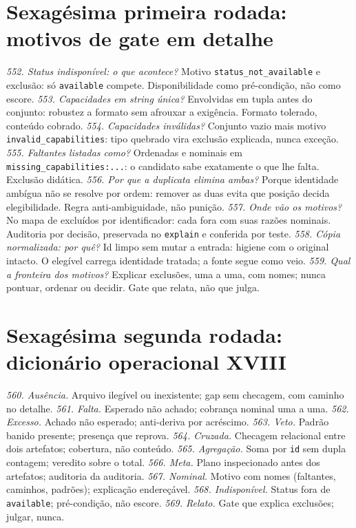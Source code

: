 \section{Sexagésima primeira rodada: motivos de gate em detalhe}
\textit{552. Status indisponível: o que acontece?} Motivo \texttt{status\_not\_available} e exclusão: só \texttt{available} compete. Disponibilidade como pré-condição, não como escore.
\textit{553. Capacidades em string única?} Envolvidas em tupla antes do conjunto: robustez a formato sem afrouxar a exigência. Formato tolerado, conteúdo cobrado.
\textit{554. Capacidades inválidas?} Conjunto vazio mais motivo \texttt{invalid\_capabilities}: tipo quebrado vira exclusão explicada, nunca exceção.
\textit{555. Faltantes listadas como?} Ordenadas e nominais em \texttt{missing\_capabilities:...}: o candidato sabe exatamente o que lhe falta. Exclusão didática.
\textit{556. Por que a duplicata elimina ambas?} Porque identidade ambígua não se resolve por ordem: remover as duas evita que posição decida elegibilidade. Regra anti-ambiguidade, não punição.
\textit{557. Onde vão os motivos?} No mapa de excluídos por identificador: cada fora com suas razões nominais. Auditoria por decisão, preservada no \texttt{explain} e conferida por teste.
\textit{558. Cópia normalizada: por quê?} Id limpo sem mutar a entrada: higiene com o original intacto. O elegível carrega identidade tratada; a fonte segue como veio.
\textit{559. Qual a fronteira dos motivos?} Explicar exclusões, uma a uma, com nomes; nunca pontuar, ordenar ou decidir. Gate que relata, não que julga.
\section{Sexagésima segunda rodada: dicionário operacional XVIII}
\textit{560. Ausência.} Arquivo ilegível ou inexistente; gap sem checagem, com caminho no detalhe.
\textit{561. Falta.} Esperado não achado; cobrança nominal uma a uma.
\textit{562. Excesso.} Achado não esperado; anti-deriva por acréscimo.
\textit{563. Veto.} Padrão banido presente; presença que reprova.
\textit{564. Cruzada.} Checagem relacional entre dois artefatos; cobertura, não conteúdo.
\textit{565. Agregação.} Soma por \texttt{id} sem dupla contagem; veredito sobre o total.
\textit{566. Meta.} Plano inspecionado antes dos artefatos; auditoria da auditoria.
\textit{567. Nominal.} Motivo com nomes (faltantes, caminhos, padrões); explicação endereçável.
\textit{568. Indisponível.} Status fora de \texttt{available}; pré-condição, não escore.
\textit{569. Relato.} Gate que explica exclusões; julgar, nunca.
